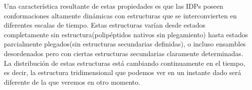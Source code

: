Una característica resultante de estas propiedades es que las IDPs poseen conformaciones altamente dinámicas con estructuras que se interconvierten en diferentes escalas de tiempo. 
Estas estructuras varían desde estados completamente sin estructura(polipéptidos nativos sin plegamiento) hasta estados parcialmente plegados(sin estructuras secundarias definidas), o incluso ensambles desordenados pero con ciertas
estructuras secundarias claramente determinadas.
La distribución de estas estructuras está cambiando continuamente en el tiempo, es decir, la estructura tridimensional que podemos ver en un instante dado será diferente de la que veremos en otro momento.



